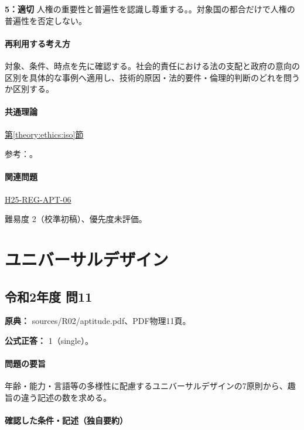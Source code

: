 \noindent\textbf{5：適切} 人権の重要性と普遍性を認識し尊重する。。対象国の都合だけで人権の普遍性を否定しない。\par

\paragraph{再利用する考え方} 対象、条件、時点を先に確認する。社会的責任における法の支配と政府の意向の区別を具体的な事例へ適用し、技術的原因・法的要件・倫理的判断のどれを問うか区別する。

\paragraph{共通理論} \hyperref[theory:ethics:iso]{第\ref*{theory:ethics:iso}節}

\par 参考：\cite{iso26000,iso_gri2014}。

\paragraph{関連問題} \hyperref[q:h25-reg-apt-06]{H25-REG-APT-06}

\par 難易度 2（校準初稿）、優先度未評価。

\section{ユニバーサルデザイン}

\subsection{令和2年度 問11}
\label{q:r02-reg-apt-11}

\noindent\textbf{原典：} sources/R02/aptitude.pdf、PDF物理11頁。

\textbf{公式正答：} 1（single）。

\paragraph{問題の要旨} 年齢・能力・言語等の多様性に配慮するユニバーサルデザインの7原則から、趣旨の違う記述の数を求める。

\paragraph{確認した条件・記述（独自要約）}\mbox{}\par

